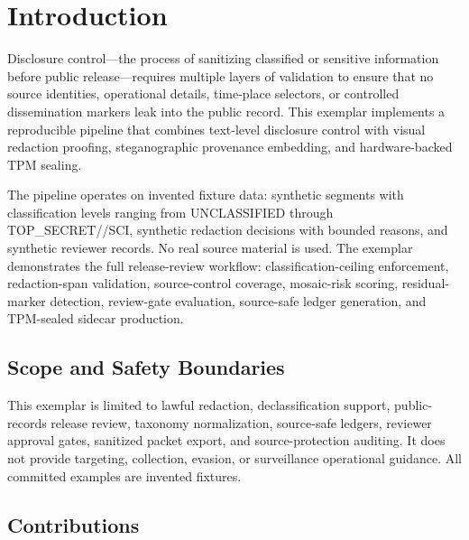 \documentclass[
]{article}
\begin{document}
\newpage

\section{Introduction}\label{introduction}

Disclosure control---the process of sanitizing classified or sensitive
information before public release---requires multiple layers of
validation to ensure that no source identities, operational details,
time-place selectors, or controlled dissemination markers leak into the
public record. This exemplar implements a reproducible pipeline that
combines text-level disclosure control with visual redaction proofing,
steganographic provenance embedding, and hardware-backed TPM sealing.

The pipeline operates on invented fixture data: synthetic segments with
classification levels ranging from UNCLASSIFIED through
TOP\_SECRET//SCI, synthetic redaction decisions with bounded reasons,
and synthetic reviewer records. No real source material is used. The
exemplar demonstrates the full release-review workflow:
classification-ceiling enforcement, redaction-span validation,
source-control coverage, mosaic-risk scoring, residual-marker detection,
review-gate evaluation, source-safe ledger generation, and TPM-sealed
sidecar production.

\subsection{Scope and Safety
Boundaries}\label{scope-and-safety-boundaries}

This exemplar is limited to lawful redaction, declassification support,
public-records release review, taxonomy normalization, source-safe
ledgers, reviewer approval gates, sanitized packet export, and
source-protection auditing. It does not provide targeting, collection,
evasion, or surveillance operational guidance. All committed examples
are invented fixtures.

\subsection{Contributions}\label{contributions}
\end{document}
